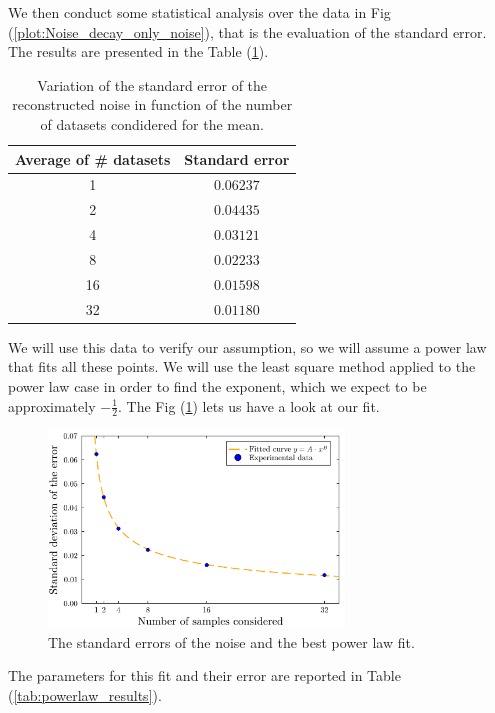 \documentclass[a4paper,12pt]{article}
\begin{document}
\par We then conduct some statistical analysis over the data in 
Fig (\ref{plot:Noise_decay_only_noise}), that is the evaluation of the standard error.
The results are presented in the Table (\ref{tab:sigma_error}).

\begin{table}[h]
    \centering
    \begin{tabular}{|c|c|}
        \hline
        Average of \# datasets & Standard error \\
        \hline
        1 & $0.06237$ \\
        2 & $0.04435$ \\
        4 & $0.03121$ \\
        8 & $0.02233$ \\
        16 & $0.01598$ \\
        32 & $0.01180$ \\
        \hline
    \end{tabular}
    \caption{Variation of the standard error of the reconstructed noise in function of the number of datasets condidered for the mean.}
    \label{tab:sigma_error}
\end{table}

\par We will use this data to verify our assumption, so we will assume a power law
that fits all these points. We will use the least square method applied to the 
power law case in order to find the exponent, which we expect to be approximately $- \frac{1}{2}$.
The Fig (\ref{plot:error_fit}) lets us have a look at our fit.
\begin{figure}[H]
    \centering
    \includegraphics[width=0.7\textwidth]{Std_error.pdf}
    \caption{The standard errors of the noise and the best power law fit.}
    \label{plot:error_fit}
\end{figure}

\par The parameters for this fit and their error are reported in Table (\ref{tab:powerlaw_results}).
\end{document}
